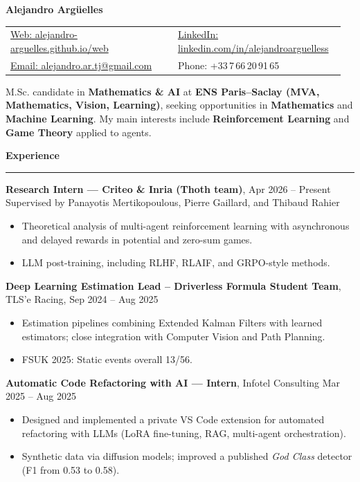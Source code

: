 \documentclass[9pt,a4paper]{extarticle}
\newcommand{\cvsection}[1]{%
  \vspace{5pt}%
  {\large\textbf{#1}}\\[-4pt]%
  \rule{\linewidth}{0.6pt}\vspace{2pt}%
}
\begin{document}
\pagestyle{empty}
{\LARGE \textbf{Alejandro Argüelles}}\\[4pt]

\begin{tabular}{@{}p{0.48\linewidth}p{0.48\linewidth}@{}}
\href{https://alejandro-arguelles.github.io/web/}{Web: alejandro-arguelles.github.io/web} &
\href{https://www.linkedin.com/in/alejandroarguelless/}{LinkedIn: linkedin.com/in/alejandroarguelless} \\[3pt]
\href{mailto:alejandro.ar.tj@gmail.com}{Email: alejandro.ar.tj@gmail.com} &
Phone: +33\,7\,66\,20\,91\,65 \\
\end{tabular}

\vspace{8pt}

M.Sc. candidate in \textbf{Mathematics \& AI} at \textbf{ENS Paris--Saclay (MVA, Mathematics, Vision, Learning)}, seeking opportunities in \textbf{Mathematics} and \textbf{Machine Learning}. My main interests include \textbf{Reinforcement Learning} and \textbf{Game Theory} applied to agents.

\cvsection{Experience}

\textbf{Research Intern --- Criteo \& Inria (Thoth team)}, \hfill Apr 2026 -- Present\\
Supervised by Panayotis Mertikopoulous, Pierre Gaillard, and Thibaud Rahier
\begin{itemize}
  \item Theoretical analysis of multi-agent reinforcement learning with asynchronous and delayed rewards in potential and zero-sum games.
  \item LLM post-training, including RLHF, RLAIF, and GRPO-style methods.
\end{itemize}

\textbf{Deep Learning Estimation Lead -- Driverless Formula Student Team}, TLS’e Racing, \hfill Sep 2024 -- Aug 2025
\begin{itemize}
  \item Estimation pipelines combining Extended Kalman Filters with learned estimators; close integration with Computer Vision and Path Planning.
  \item FSUK 2025: Static events overall 13/56.
\end{itemize}

\textbf{Automatic Code Refactoring with AI --- Intern}, Infotel Consulting \hfill Mar 2025 -- Aug 2025
\begin{itemize}
  \item Designed and implemented a private VS Code extension for automated refactoring with LLMs (LoRA fine-tuning, RAG, multi-agent orchestration).
  \item Synthetic data via diffusion models; improved a published \emph{God Class} detector (F1 from 0.53 to 0.58).
\end{itemize}
\end{document}
